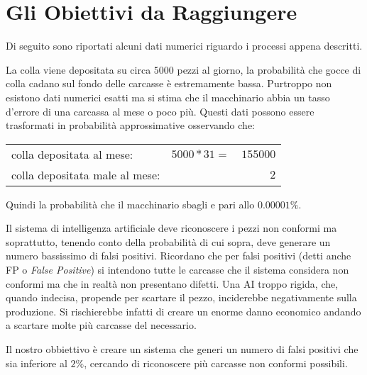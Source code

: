 \clearpage
\section{Gli Obiettivi da Raggiungere}
Di seguito sono riportati alcuni dati numerici riguardo i processi appena descritti.

La colla viene depositata su circa $5000$ pezzi al giorno, la probabilità che gocce di colla cadano sul fondo delle carcasse è estremamente bassa.
Purtroppo non esistono dati numerici esatti ma si stima che il macchinario abbia un tasso d'errore di una carcassa al mese o poco più.
Questi dati possono essere trasformati in probabilità approssimative osservando che:

\begin{center}
  \begin{tabular}{ l c r }
    colla depositata al mese: & $5000 * 31 =$& $155000$ \\
    colla depositata male al mese: && $2$
  \end{tabular}
\end{center}
Quindi la probabilità che il macchinario sbagli e pari allo $0.00001\%$.

Il sistema di intelligenza artificiale deve riconoscere i pezzi non conformi ma soprattutto, tenendo conto della probabilità di cui sopra, deve generare un numero bassissimo di falsi positivi.
Ricordano che per falsi positivi (detti anche FP o \textit{False Positive}) si intendono tutte le carcasse che il sistema considera non conformi ma che in realtà non presentano difetti.
Una AI troppo rigida, che, quando indecisa, propende per scartare il pezzo, inciderebbe negativamente sulla produzione.
Si rischierebbe infatti di creare un enorme danno economico andando a scartare molte più carcasse del necessario.

Il nostro obbiettivo è creare un sistema che generi un numero di falsi positivi che sia inferiore al $2\%$, cercando di riconoscere più carcasse non conformi possibili.





